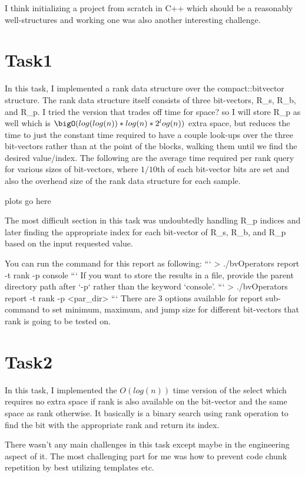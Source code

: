 \documentclass[11pt]{article}
\begin{document}
    I think initializing a project from scratch in C++ which should be a reasonably well-structures and working one was also another interesting challenge.


    \section{Task1}
    In this task, I implemented a rank data structure over the compact::bitvector structure.
    The rank data structure itself consists of three bit-vectors, R_s, R_b, and R_p. I tried the version that
    trades off time for space? so I will store R_p as well which is $\bigO(log(log(n))*log(n)*2^log(n))$ extra space,
    but reduces the time to just the constant time required to have a couple look-ups over the three bit-vectors
    rather than at the point of the blocks, walking them until we find the desired value/index.
    The following are the average time required per rank query for various sizes of bit-vectors,
    where $1/10$th of each bit-vector bits are set and also the overhead size of the rank data structure for each sample.


    plots go here



    The most difficult section in this task was undoubtedly handling R_p indices and later finding the appropriate index
    for each bit-vector of R_s, R_b, and R_p based on the input requested value.

    You can run the command for this report as following:
    ```
    > ./bvOperators report -t rank -p console
    ```
    If you want to store the results in a file, provide the parent directory path after `-p` rather than the keyword `console'.
    ```
    > ./bvOperators report -t rank -p <par_dir>
    ```
    There are 3 options available for report sub-command to set minimum, maximum, and jump size for different bit-vectors that rank is going to be tested on.

    \section{Task2}
    In this task, I implemented the $O(log(n))$ time version of the select which requires no extra space
    if rank is also available on the bit-vector and the same space as rank otherwise. It basically is
    a binary search using rank operation to find the bit with the appropriate rank and return its index.

    There wasn't any main challenges in this task except maybe in the engineering aspect of it.
    The most challenging part for me was how to prevent code chunk repetition by best utilizing templates
    etc.
\end{document}
